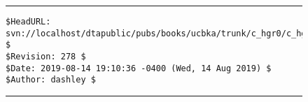 





\noindent\begin{figure}[!b]
\noindent\rule[-0.25in]{\textwidth}{1pt}
\begin{tiny}
\begin{verbatim}
$HeadURL: svn://localhost/dtapublic/pubs/books/ucbka/trunk/c_hgr0/c_hgr0.tex $
$Revision: 278 $
$Date: 2019-08-14 19:10:36 -0400 (Wed, 14 Aug 2019) $
$Author: dashley $
\end{verbatim}
\end{tiny}
\noindent\rule[0.25in]{\textwidth}{1pt}
\end{figure}

% 
